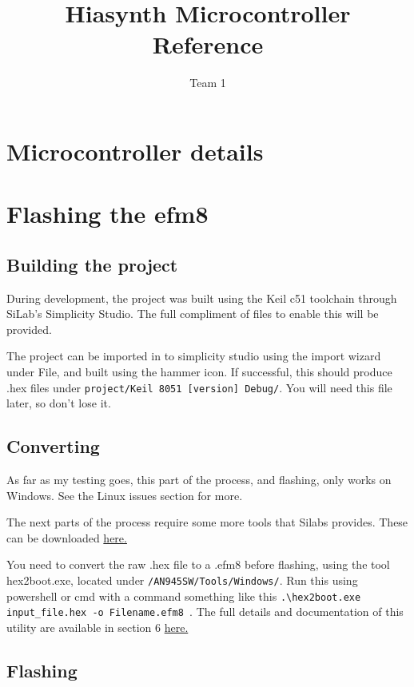 \documentclass[a4paper]{article}
\title{Hiasynth Microcontroller Reference} %
\author{Team 1}
\begin{document}
\maketitle

\section{Microcontroller details}

\section{Flashing the efm8 }
\subsection{Building the project}
During development, the project was built using the Keil c51 toolchain through SiLab's Simplicity Studio. The full compliment of files to enable this will be provided. 

The project can be imported in to simplicity studio using the import wizard under File, and built using the hammer icon. If successful, this should produce .hex files under \lstinline|project/Keil 8051 [version] Debug/|. You will need this file later, so don't lose it.

\subsection{Converting}
As far as my testing goes, this part of the process, and flashing, only works on Windows. See the Linux issues section for more.

The next parts of the process require some more tools that Silabs provides. These can be downloaded \href{https://www.silabs.com/documents/public/example-code/AN945SW.zip}{here.}

You need to convert the raw .hex file to a .efm8 before flashing, using the tool hex2boot.exe, located under \lstinline|/AN945SW/Tools/Windows/|. Run this using powershell or cmd with a command something like this \lstinline|.\hex2boot.exe input_file.hex -o Filename.efm8 |. The full details and documentation of this utility are available in section 6 \href{https://www.silabs.com/documents/public/application-notes/an945-efm8-factory-bootloader-user-guide.pdf}{here.}

\subsection{Flashing}
\end{document}
